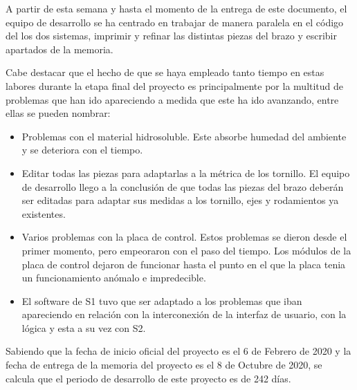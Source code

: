 A partir de esta semana y hasta el momento de la entrega de este documento, el equipo de desarrollo se ha centrado en trabajar de manera paralela en el código del los dos sistemas, imprimir y refinar las distintas piezas del brazo y escribir apartados de la memoria.

Cabe destacar que el hecho de que se haya empleado tanto tiempo en estas labores durante la etapa final del proyecto es principalmente por la multitud de problemas que han ido apareciendo a medida que este ha ido avanzando, entre ellas se pueden nombrar:

\begin{itemize}
    \item Problemas con el material hidrosoluble. Este absorbe humedad del ambiente y se deteriora con el tiempo.
    \item Editar todas las piezas para adaptarlas a la métrica de los tornillo. El equipo de desarrollo llego a la conclusión de que todas las piezas del brazo deberán ser editadas para adaptar sus medidas a los tornillo, ejes y rodamientos ya existentes.
    \item Varios problemas con la placa de control. Estos problemas se dieron desde el primer momento, pero empeoraron con el paso del tiempo. Los módulos de la placa de control dejaron de funcionar hasta el punto en el que la placa tenia un funcionamiento anómalo e impredecible.
    \item El software de \ac{S1} tuvo que ser adaptado a
    los problemas que iban apareciendo en relación con la interconexión de la interfaz de usuario, con la lógica y esta a su vez con \ac{S2}.
\end{itemize}

Sabiendo que la fecha de inicio oficial del proyecto es el 6 de Febrero de 2020  y la fecha de entrega de la memoria del proyecto es el 8 de Octubre de 2020, se calcula que el periodo de desarrollo de este proyecto es de 242 días.



